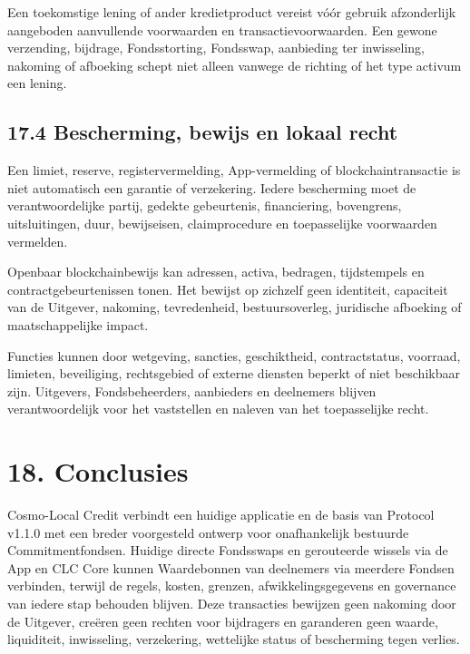 \documentclass[11pt]{article}
\begin{document}
Een toekomstige lening of ander kredietproduct vereist vóór gebruik afzonderlijk aangeboden aanvullende voorwaarden en transactievoorwaarden. Een gewone verzending, bijdrage, Fondsstorting, Fondsswap, aanbieding ter inwisseling, nakoming of afboeking schept niet alleen vanwege de richting of het type activum een lening.

\subsection*{17.4 Bescherming, bewijs en lokaal recht}

Een limiet, reserve, registervermelding, App-vermelding of blockchaintransactie is niet automatisch een garantie of verzekering. Iedere bescherming moet de verantwoordelijke partij, gedekte gebeurtenis, financiering, bovengrens, uitsluitingen, duur, bewijseisen, claimprocedure en toepasselijke voorwaarden vermelden.

Openbaar blockchainbewijs kan adressen, activa, bedragen, tijdstempels en contractgebeurtenissen tonen. Het bewijst op zichzelf geen identiteit, capaciteit van de Uitgever, nakoming, tevredenheid, bestuursoverleg, juridische afboeking of maatschappelijke impact.

Functies kunnen door wetgeving, sancties, geschiktheid, contractstatus, voorraad, limieten, beveiliging, rechtsgebied of externe diensten beperkt of niet beschikbaar zijn. Uitgevers, Fondsbeheerders, aanbieders en deelnemers blijven verantwoordelijk voor het vaststellen en naleven van het toepasselijke recht.


\section*{18. Conclusies}

Cosmo-Local Credit verbindt een huidige applicatie en de basis van Protocol v1.1.0 met een breder voorgesteld ontwerp voor onafhankelijk bestuurde Commitmentfondsen. Huidige directe Fondsswaps en gerouteerde wissels via de App en CLC Core kunnen Waardebonnen van deelnemers via meerdere Fondsen verbinden, terwijl de regels, kosten, grenzen, afwikkelingsgegevens en governance van iedere stap behouden blijven. Deze transacties bewijzen geen nakoming door de Uitgever, creëren geen rechten voor bijdragers en garanderen geen waarde, liquiditeit, inwisseling, verzekering, wettelijke status of bescherming tegen verlies.
\end{document}
